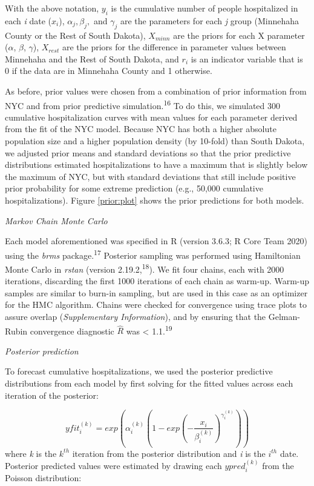 \documentclass[
]{article}
\begin{document}
With the above notation, \(y_i\) is the cumulative number of people hospitalized in each \emph{i} date (\(x_i\)), \(\alpha_j, \beta_j,\) and \(\gamma_j\) are the parameters for each \emph{j} group (Minnehaha County or the Rest of South Dakota), \(X_{minn}\) are the priors for each X parameter (\(\alpha\), \(\beta\), \(\gamma\)), \(X_{rest}\) are the priors for the difference in parameter values between Minnehaha and the Rest of South Dakota, and \(r_i\) is an indicator variable that is 0 if the data are in Minnehaha County and 1 otherwise.

As before, prior values were chosen from a combination of prior information from NYC and from prior predictive simulation.\textsuperscript{16} To do this, we simulated 300 cumulative hospitalization curves with mean values for each parameter derived from the fit of the NYC model. Because NYC has both a higher absolute population size and a higher population density (by 10-fold) than South Dakota, we adjusted prior means and standard deviations so that the prior predictive distributions estimated hospitalizations to have a maximum that is slightly below the maximum of NYC, but with standard deviations that still include positive prior probability for some extreme prediction (e.g., 50,000 cumulative hospitalizations). Figure \ref{prior:plot} shows the prior predictions for both models.

\emph{Markov Chain Monte Carlo}

Each model aforementioned was specified in R (version 3.6.3; R Core Team 2020) using the \emph{brms} package.\textsuperscript{17} Posterior sampling was performed using Hamiltonian Monte Carlo in \emph{rstan} (version 2.19.2,\textsuperscript{18}). We fit four chains, each with 2000 iterations, discarding the first 1000 iterations of each chain as warm-up. Warm-up samples are similar to burn-in sampling, but are used in this case as an optimizer for the HMC algorithm. Chains were checked for convergence using trace plots to assure overlap (\emph{Supplementary Information}), and by ensuring that the Gelman-Rubin convergence diagnostic \(\hat{R}\) was \textless{} 1.1.\textsuperscript{19}

\emph{Posterior prediction}

To forecast cumulative hospitalizations, we used the posterior predictive distributions from each model by first solving for the fitted values across each iteration of the posterior:

\[yfit_i^{(k)} = exp\left(\alpha_i^{(k)}\left(1 - exp\left(-\frac{x_i}{\beta_i^{(k)}}\right)^{\gamma_i^{(k)}}\right)\right)\]
where \emph{k} is the \(k^{th}\) iteration from the posterior distribution and \emph{i} is the \(i^{th}\) date. Posterior predicted values were estimated by drawing each \(ypred_i^{(k)}\) from the Poisson distribution:
\end{document}
